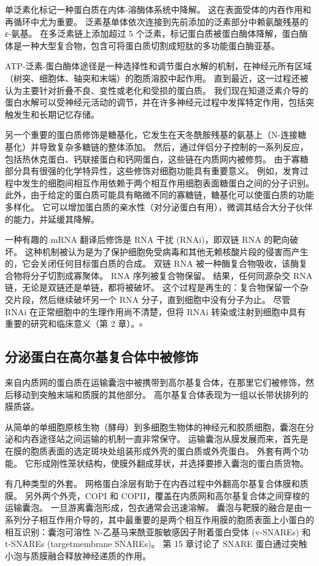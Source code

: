 单泛素化标记一种蛋白质在内体-溶酶体系统中降解。 这在表面受体的内吞作用和再循环中尤为重要。 泛素基单体依次连接到先前添加的泛素部分中赖氨酸残基的ε-氨基。 在多泛素链上添加超过 5 个泛素，标记蛋白质被蛋白酶体降解，蛋白酶体是一种大型复合物，包含可将蛋白质切割成短肽的多功能蛋白酶亚基。

ATP-泛素-蛋白酶体途径是一种选择性和调节蛋白水解的机制，在神经元所有区域（树突、细胞体、轴突和末端）的胞质溶胶中起作用。 直到最近，这一过程还被认为主要针对折叠不良、变性或老化和受损的蛋白质。 我们现在知道泛素介导的蛋白水解可以受神经元活动的调节，并在许多神经元过程中发挥特定作用，包括突触发生和长期记忆存储。

另一个重要的蛋白质修饰是糖基化，它发生在天冬酰胺残基的氨基上（N-连接糖基化）并导致复杂多糖链的整体添加。 然后，通过伴侣分子控制的一系列反应，包括热休克蛋白、钙联接蛋白和钙网蛋白，这些链在内质网内被修剪。 由于寡糖部分具有很强的化学特异性，这些修饰对细胞功能具有重要意义。 例如，发育过程中发生的细胞间相互作用依赖于两个相互作用细胞表面糖蛋白之间的分子识别。 此外，由于给定的蛋白质可能具有略微不同的寡糖链，糖基化可以使蛋白质的功能多样化。 它可以增加蛋白质的亲水性（对分泌蛋白有用），微调其结合大分子伙伴的能力，并延缓其降解。

一种有趣的 mRNA 翻译后修饰是 RNA 干扰 (RNAi)，即双链 RNA 的靶向破坏。 这种机制被认为是为了保护细胞免受病毒和其他无赖核酸片段的侵害而产生的，它会关闭任何目标蛋白质的合成。 双链 RNA 被一种酶复合物吸收，该酶复合物将分子切割成寡聚体。 RNA 序列被复合物保留。 结果，任何同源杂交 RNA 链，无论是双链还是单链，都将被破坏。 这个过程是再生的：复合物保留一个杂交片段，然后继续破坏另一个 RNA 分子，直到细胞中没有分子为止。 尽管 RNAi 在正常细胞中的生理作用尚不清楚，但将 RNAi 转染或注射到细胞中具有重要的研究和临床意义（第 2 章）。s


\subsection{分泌蛋白在高尔基复合体中被修饰}

来自内质网的蛋白质在运输囊泡中被携带到高尔基复合体，在那里它们被修饰，然后移动到突触末端和质膜的其他部分。 高尔基复合体表现为一组以长带状排列的膜质袋。

从简单的单细胞原核生物（酵母）到多细胞生物体的神经元和胶质细胞，囊泡在分泌和内吞途径站之间运输的机制一直非常保守。 运输囊泡从膜发展而来，首先是在膜的胞质表面的选定斑块处组装形成外壳的蛋白质或外壳蛋白。 外套有两个功能。 它形成刚性笼状结构，使膜外翻成芽状，并选择要掺入囊泡的蛋白质货物。

有几种类型的外套。 网格蛋白涂层有助于在内吞过程中外翻高尔基复合体膜和质膜。 另外两个外壳，COPI 和 COPII，覆盖在内质网和高尔基复合体之间穿梭的运输囊泡。 一旦游离囊泡形成，包衣通常会迅速溶解。 囊泡与靶膜的融合是由一系列分子相互作用介导的，其中最重要的是两个相互作用膜的胞质表面上小蛋白的相互识别：囊泡可溶性 N-乙基马来酰亚胺敏感因子附着蛋白受体 (v-SNAREs) 和 t-SNAREs (targetmembrane SNAREs)。 第 15 章讨论了 SNARE 蛋白通过突触小泡与质膜融合释放神经递质的作用。


